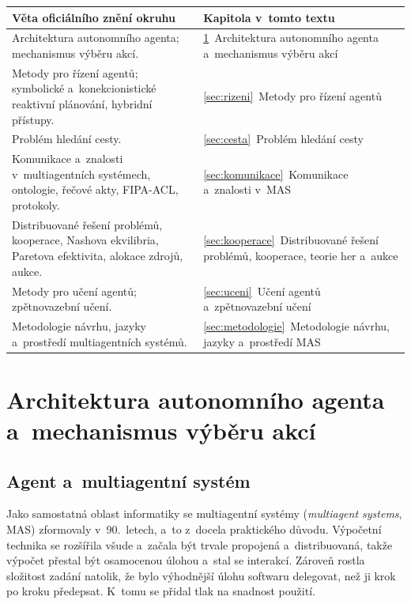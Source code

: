 \documentclass[11pt,a4paper]{article}
\theoremstyle{definition}
\begin{document}
\begin{center}
\small
\begin{tabular}{p{} p{}}
\toprule
\textbf{Věta oficiálního znění okruhu} & \textbf{Kapitola v~tomto textu} \\
\midrule
Architektura autonomního agenta; mechanismus výběru akcí.
  & \ref{sec:architektura}~Architektura autonomního agenta a~mechanismus výběru akcí \\
Metody pro řízení agentů; symbolické a~konekcionistické reaktivní plánování, hybridní
přístupy.
  & \ref{sec:rizeni}~Metody pro řízení agentů \\
Problém hledání cesty.
  & \ref{sec:cesta}~Problém hledání cesty \\
Komunikace a~znalosti v~multiagentních systémech, ontologie, řečové akty, FIPA-ACL,
protokoly.
  & \ref{sec:komunikace}~Komunikace a~znalosti v~MAS \\
Distribuované řešení problémů, kooperace, Nashova ekvilibria, Paretova efektivita, alokace
zdrojů, aukce.
  & \ref{sec:kooperace}~Distribuované řešení problémů, kooperace, teorie her a~aukce \\
Metody pro učení agentů; zpětnovazební učení.
  & \ref{sec:uceni}~Učení agentů a~zpětnovazební učení \\
Metodologie návrhu, jazyky a~prostředí multiagentních systémů.
  & \ref{sec:metodologie}~Metodologie návrhu, jazyky a~prostředí MAS \\
\bottomrule
\end{tabular}
\end{center}

\tableofcontents
\newpage

\section{Architektura autonomního agenta a~mechanismus výběru akcí}
\label{sec:architektura}

\subsection{Agent a~multiagentní systém}

Jako samostatná oblast informatiky se multiagentní systémy (\emph{multiagent systems}, MAS)
zformovaly v~90.~letech, a~to z~docela praktického důvodu. Výpočetní technika se rozšířila
všude a~začala být trvale propojená a~distribuovaná, takže výpočet přestal být osamocenou
úlohou a~stal se interakcí. Zároveň rostla složitost zadání natolik, že bylo výhodnější úlohu
softwaru delegovat, než ji krok po kroku předepsat. K~tomu se přidal tlak na snadnost použití.
\end{document}
